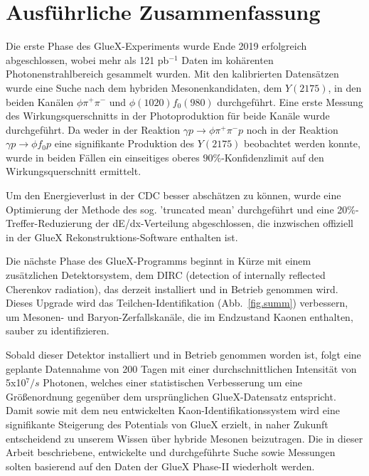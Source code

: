 \chapter{Ausf\"uhrliche Zusammenfassung}
\label{chap.zusammen}

Die erste Phase des GlueX-Experiments wurde Ende 2019 erfolgreich abgeschlossen, wobei mehr als 121 pb$^{-1}$ Daten im koh\"arenten Photonenstrahlbereich gesammelt wurden. Mit den kalibrierten Datens\"atzen wurde eine Suche nach dem hybriden Mesonenkandidaten, dem $Y(2175)$, in den beiden Kan\"alen $\phi\pi^{+}\pi^{-}$ und $\phi(1020) f_0(980)$ durchgef\"uhrt. Eine erste Messung des Wirkungsquerschnitts in der Photoproduktion für beide Kan\"ale wurde durchgef\"uhrt. Da weder in der Reaktion $\gamma p \rightarrow \phi \pi^+\pi^- p$ noch in der Reaktion $\gamma p \rightarrow \phi f_0 p$ eine signifikante Produktion des $Y(2175)$ beobachtet werden konnte, wurde in beiden F\"allen ein einseitiges oberes $90\%$-Konfidenzlimit auf den Wirkungsquerschnitt ermittelt.
~\par Um den Energieverlust in der CDC besser absch\"atzen zu k\"onnen, wurde eine Optimierung der Methode des sog. 'truncated mean' durchgef\"uhrt und eine 20$\%$-Treffer-Reduzierung der dE/dx-Verteilung abgeschlossen, die inzwischen offiziell in der GlueX Rekonstruktions-Software enthalten ist.
~\par Die n\"achste Phase des GlueX-Programms beginnt in K\"urze mit einem zus\"atzlichen Detektorsystem, dem DIRC (detection of internally reflected Cherenkov radiation), das derzeit installiert und in Betrieb genommen wird. Dieses Upgrade wird das Teilchen-Identifikation (Abb.~\ref{fig.summ}) verbessern, um Mesonen- und Baryon-Zerfallskan\"ale, die im Endzustand Kaonen enthalten, sauber zu identifizieren.
~\par Sobald dieser Detektor installiert und in Betrieb genommen worden ist, folgt eine geplante Datennahme von 200 Tagen mit einer durchschnittlichen Intensit\"at von 5x10$^{7}/s$ Photonen, welches einer statistischen Verbesserung um eine Gr\"oßenordnung gegen\"uber dem urspr\"unglichen GlueX-Datensatz entspricht. Damit sowie mit dem neu entwickelten Kaon-Identifikationssystem wird eine signifikante Steigerung des Potentials von GlueX erzielt, in naher Zukunft entscheidend zu unserem Wissen \"uber hybride Mesonen beizutragen. Die in dieser Arbeit beschriebene, entwickelte und durchgef\"uhrte Suche sowie Messungen solten basierend auf den Daten der GlueX Phase-II wiederholt werden.
 

